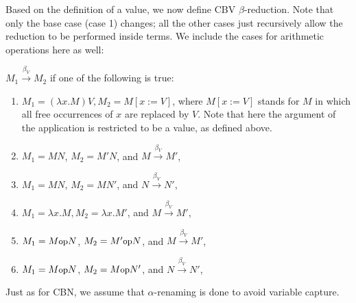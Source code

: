 \documentclass{article}
\newcommand{\lam}{\lambda}
\newcommand{\cbvb}{\overset{\beta_{V}}{\rightarrow}}
\newcommand{\op}{\mbox{\small{op}}}
\begin{document}
Based on the definition of a value, we now define CBV $\beta$-reduction. Note that only the base case (case 1) changes; all the other cases just recursively allow the reduction to be performed inside terms. We include the cases for arithmetic operations here as well:

$M_1 \cbvb M_2$ if one of the following is true:
\begin{enumerate}
\item $M_1 = (\lam x. M) V, M_2 = M [ x := V]$, where $M [ x := V]$ stands for $M$ in which all free occurrences of $x$ are replaced by $V$. Note that here the argument of the application is restricted to be a value, as defined above. 
\item $M_1 = MN$, $M_2 = M'N$, and $M \cbvb M'$,
\item $M_1 = MN$, $M_2 = MN'$, and $N \cbvb N'$,
\item $M_1 = \lam x. M, M_2 = \lam x. M'$, and $M \cbvb M'$,
\item $M_1 = M \op N$, $M_2 = M' \op N$, and $M \cbvb M'$,
\item $M_1 = M \op N$, $M_2 = M \op N'$, and $N \cbvb N'$,
\end{enumerate}
Just as for CBN, we assume that $\alpha$-renaming is done to avoid variable capture. 
\end{document}
